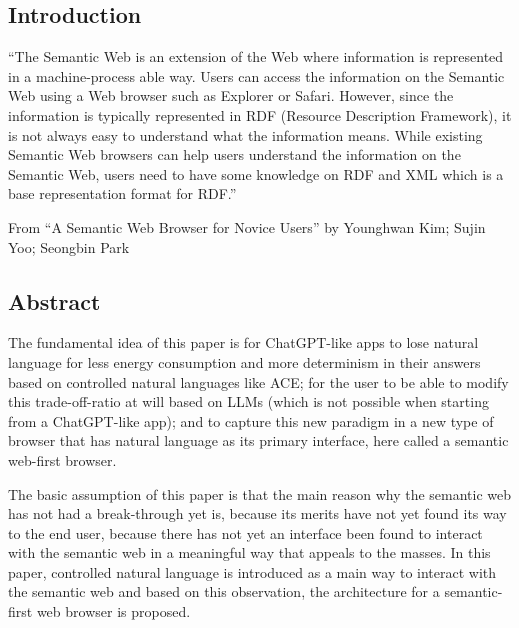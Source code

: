 \documentclass[12pt,a4paper]{article}
\begin{document}
\subsection{Introduction}

``The Semantic Web is an extension of the Web where information is represented in a machine-process able way. Users can access the information on the Semantic Web using a Web browser such as Explorer or Safari. However, since the information is typically represented in RDF (Resource Description Framework), it is not always easy to understand what the information means. While existing Semantic Web browsers can help users understand the information on the Semantic Web, users need to have some knowledge on RDF and XML which is a base representation format for RDF.''

From ``A Semantic Web Browser for Novice Users'' by Younghwan Kim; Sujin Yoo; Seongbin Park

\subsection{Abstract}

The fundamental idea of this paper is for ChatGPT-like apps to lose natural language for less energy consumption and more determinism in their answers based on controlled natural languages like ACE; for the user to be able to modify this trade-off-ratio at will based on LLMs (which is not possible when starting from a ChatGPT-like app); and to capture this new paradigm in a new type of browser that has natural language as its primary interface, here called a semantic web-first browser.

The basic assumption of this paper is that the main reason why the semantic web has not had a break-through yet is, because its merits have not yet found its way to the end user, because there has not yet an interface been found to interact with the semantic web in a meaningful way that appeals to the masses. In this paper, controlled natural language is introduced as a main way to interact with the semantic web and based on this observation, the architecture for a semantic-first web browser is proposed.
\end{document}
